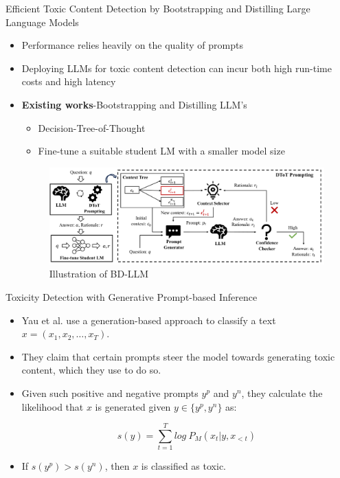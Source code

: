 \begin{frame}{Efficient Toxic Content Detection by Bootstrapping and Distilling Large Language Models}

    \begin{itemize}

    \item Performance relies heavily on the quality of prompts
    \item Deploying LLMs for toxic content detection can incur both high run-time costs and high latency 
    \item \textbf{Existing works}-Bootstrapping and Distilling LLM's
    \begin{itemize}
        \item Decision-Tree-of-Thought
        \item Fine-tune a suitable student LM with a smaller model size
    \end{itemize}
    \begin{figure}
        \centering
        \includegraphics[width=1\linewidth]{images/BD_LLM.png}
        \caption{Illustration of BD-LLM}
        \label{fig:1}
    \end{figure}

\end{itemize}
    
\end{frame}


\begin{frame}{Toxicity Detection with Generative Prompt-based Inference}

\begin{itemize}
    \item Yau et al. use a generation-based approach to classify a text $x = (x_1, x_2, \dots, x_T)$.
    \item They claim that certain prompts steer the model towards generating toxic content, which they use to do so.
    \item Given such positive and negative prompts $y^p$ and $y^n$, they calculate the likelihood that $x$ is generated given $y \in \{y^p, y^n\}$ as:

    \[ s(y) = \sum_{t = 1}^{T} log ~ P_M(x_t | y, x_{<t}) \]

    \item If $s(y^p) > s(y^n)$, then $x$ is classified as toxic.
\end{itemize}

\end{frame}
